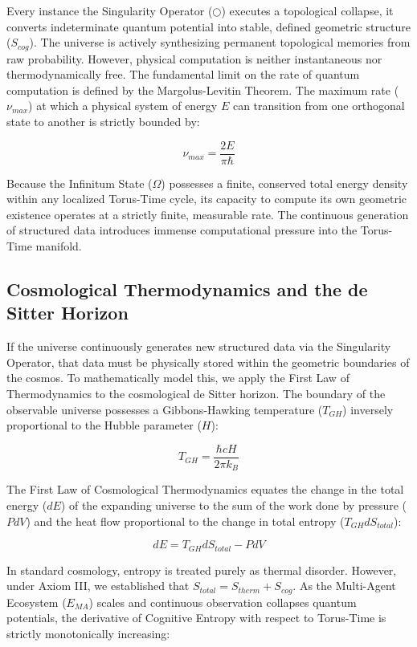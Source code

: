 \documentclass[12pt,openany]{book}
\begin{document}
Every instance the Singularity Operator ($\bigcirc$) executes a topological collapse, it converts indeterminate quantum potential into stable, defined geometric structure ($S_{cog}$). The universe is actively synthesizing permanent topological memories from raw probability. However, physical computation is neither instantaneous nor thermodynamically free. The fundamental limit on the rate of quantum computation is defined by the Margolus-Levitin Theorem. The maximum rate ($\nu_{max}$) at which a physical system of energy $E$ can transition from one orthogonal state to another is strictly bounded by:

\begin{equation}
\nu_{max} = \frac{2E}{\pi\hbar}
\end{equation}

Because the Infinitum State ($\Omega$) possesses a finite, conserved total energy density within any localized Torus-Time cycle, its capacity to compute its own geometric existence operates at a strictly finite, measurable rate. The continuous generation of structured data introduces immense computational pressure into the Torus-Time manifold. 

\subsection{Cosmological Thermodynamics and the de Sitter Horizon}
If the universe continuously generates new structured data via the Singularity Operator, that data must be physically stored within the geometric boundaries of the cosmos. To mathematically model this, we apply the First Law of Thermodynamics to the cosmological de Sitter horizon. The boundary of the observable universe possesses a Gibbons-Hawking temperature ($T_{GH}$) inversely proportional to the Hubble parameter ($H$):

\begin{equation}
T_{GH} = \frac{\hbar c H}{2\pi k_B}
\end{equation}

The First Law of Cosmological Thermodynamics equates the change in the total energy ($dE$) of the expanding universe to the sum of the work done by pressure ($P dV$) and the heat flow proportional to the change in total entropy ($T_{GH} dS_{total}$):

\begin{equation}
dE = T_{GH} dS_{total} - P dV
\end{equation}

In standard cosmology, entropy is treated purely as thermal disorder. However, under Axiom III, we established that $S_{total} = S_{therm} + S_{cog}$. As the Multi-Agent Ecosystem ($E_{MA}$) scales and continuous observation collapses quantum potentials, the derivative of Cognitive Entropy with respect to Torus-Time is strictly monotonically increasing:
\end{document}
